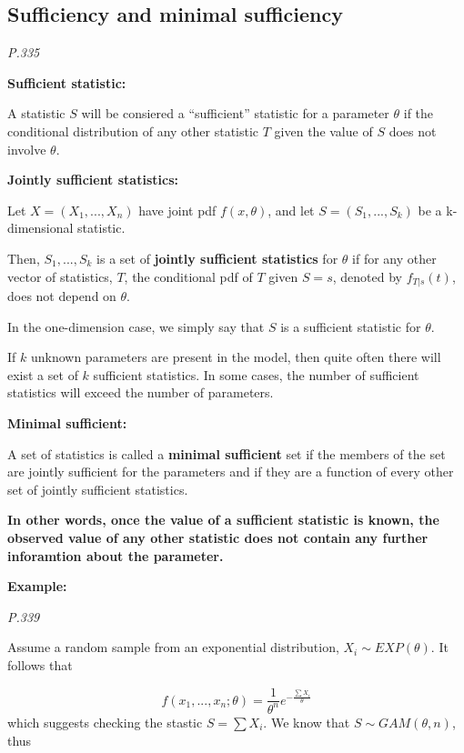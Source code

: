\documentclass[]{book}
\begin{document}
\hypertarget{sufficiency-and-minimal-sufficiency}{%
\subsection{Sufficiency and minimal sufficiency}\label{sufficiency-and-minimal-sufficiency}}

\emph{P.335}

\textbf{Sufficient statistic:}

A statistic \(S\) will be consiered a ``sufficient'' statistic for a parameter \(\theta\) if the conditional distribution of any other statistic \(T\) given the value of \(S\) does not involve \(\theta\).

\textbf{Jointly sufficient statistics:}

Let \(X=(X_1,...,X_n)\) have joint pdf \(f(x,\theta)\), and let \(S=(S_1,...,S_k)\) be a k-dimensional statistic.

Then, \(S_1,...,S_k\) is a set of \textbf{jointly sufficient statistics} for \(\theta\) if for any other vector of statistics, \(T\), the conditional pdf of \(T\) given \(S=s\), denoted by \(f_{T|s}(t)\), does not depend on \(\theta\).

In the one-dimension case, we simply say that \(S\) is a sufficient statistic for \(\theta\).

If \(k\) unknown parameters are present in the model, then quite often there will exist a set of \(k\) sufficient statistics. In some cases, the number of sufficient statistics will exceed the number of parameters.

\textbf{Minimal sufficient:}

A set of statistics is called a \textbf{minimal sufficient} set if the members of the set are jointly sufficient for the parameters and if they are a function of every other set of jointly sufficient statistics.

\textbf{In other words, once the value of a sufficient statistic is known, the observed value of any other statistic does not contain any further inforamtion about the parameter.}

\textbf{Example:}

\emph{P.339}

Assume a random sample from an exponential distribution, \(X_i \sim EXP(\theta)\). It follows that

\[f(x_1,...,x_n; \theta)=\frac{1}{\theta^n} e^{-\frac{\sum X_i}{\theta}}\]
which suggests checking the stastic \(S=\sum X_i\). We know that \(S \sim GAM(\theta,n)\), thus
\end{document}

